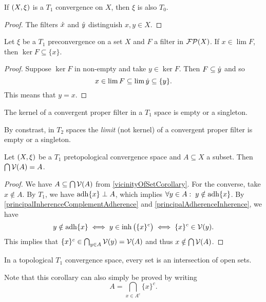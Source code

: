 \begin{lemma}
If $\sSet{X,\xi}$ is a $T_1$ convergence on $X$, then $\xi$ is also $T_0$.
\end{lemma}
\begin{proof}
The filters $\dot{x}$ and $\dot{y}$ distinguish $x,y\in X$.
\end{proof}

\begin{proposition}
Let $\xi$ be a $T_1$ preconvergence on a set $X$ and $F$ a filter in $\operatorname{\mathcal{FP}}(X)$. If $x\in \lim F$, then $\ker F \subseteq \{x\}$.
\end{proposition}
\begin{proof}
Suppose $\ker F$ in non-empty and take $y \in \ker F$. Then $F \subseteq \dot{y}$ and so
\[ x \in \lim F \subseteq \lim \dot{y} \subseteq \{y\}. \]
This means that $y = x$.
\end{proof}
\begin{corollary}
The kernel of a convergent proper filter in a $T_1$ space is empty or a singleton.
\end{corollary}
By constrast, in $T_2$ spaces the \emph{limit} (not kernel) of a convergent proper filter is empty or a singleton.

\begin{proposition} \label{setKernelVicinityFilter}
Let $\sSet{X,\xi}$ be a $T_1$ pretopological convergence space and $A \subseteq X$ a subset. Then $\bigcap\operatorname{\mathcal{V}}(A) = A$.
\end{proposition}
\begin{proof}
We have $A\subseteq \bigcap\operatorname{\mathcal{V}}(A)$ from \ref{vicinityOfSetCorollary}. For the converse, take $x\notin A$. By $T_1$, we have $\operatorname{adh}\{x\} \perp A$, which implies $\forall y\in A:\; y\notin\operatorname{adh}\{x\}$. By \ref{principalInherenceComplementAdherence} and \ref{principalAdherenceInherence}, we have
\[ y\notin\operatorname{adh}\{x\} \iff y\in \operatorname{inh}\big(\{x\}^c\big) \iff \{x\}^c\in \operatorname{\mathcal{V}}(y). \]
This implies that $\{x\}^c \in \bigcap_{y\in A}\operatorname{\mathcal{V}}(y) = \operatorname{\mathcal{V}}(A)$ and thus $x\notin \bigcap\operatorname{\mathcal{V}}(A)$.
\end{proof}
\begin{corollary}
In a topological $T_1$ convergence space, every set is an intersection of open sets.
\end{corollary}
Note that this corollary can also simply be proved by writing
\[ A = \bigcap_{x\in A^c}\{x\}^c. \]

